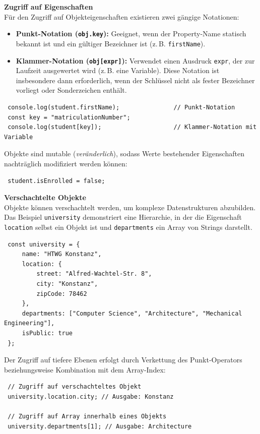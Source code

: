 \textbf{Zugriff auf Eigenschaften}\\
Für den Zugriff auf Objekteigenschaften existieren zwei gängige Notationen:
\begin{itemize}
	\item \textbf{Punkt-Notation (\texttt{obj.key}):} Geeignet, wenn der Property-Name statisch bekannt ist und ein gültiger Bezeichner ist (z.\,B. \texttt{firstName}).
	\item \textbf{Klammer-Notation (\texttt{obj[expr]}):} Verwendet einen Ausdruck \texttt{expr}, der zur Laufzeit ausgewertet wird (z.\,B. eine Variable). Diese Notation ist insbesondere dann erforderlich, wenn der Schlüssel nicht als fester Bezeichner vorliegt oder Sonderzeichen enthält.
\end{itemize}
\begin{verbatim}
 console.log(student.firstName);               // Punkt-Notation
 const key = "matriculationNumber";
 console.log(student[key]);                    // Klammer-Notation mit Variable
\end{verbatim}

Objekte sind mutable (\textit{veränderlich}), sodass Werte bestehender Eigenschaften nachträglich modifiziert werden können:
\begin{verbatim}
 student.isEnrolled = false;
\end{verbatim}

\textbf{Verschachtelte Objekte}\\
Objekte können verschachtelt werden, um komplexe Datenstrukturen abzubilden. Das Beispiel \texttt{university} demonstriert eine Hierarchie, in der die Eigenschaft \texttt{location} selbst ein Objekt ist und \texttt{departments} ein Array von Strings darstellt.
\begin{verbatim}
 const university = {
     name: "HTWG Konstanz",
     location: {
         street: "Alfred-Wachtel-Str. 8",
         city: "Konstanz",
         zipCode: 78462
     },
     departments: ["Computer Science", "Architecture", "Mechanical Engineering"],
     isPublic: true
 };
\end{verbatim}

Der Zugriff auf tiefere Ebenen erfolgt durch Verkettung des Punkt-Operators beziehungsweise Kombination mit dem Array-Index:
\begin{verbatim}
 // Zugriff auf verschachteltes Objekt
 university.location.city; // Ausgabe: Konstanz
	
 // Zugriff auf Array innerhalb eines Objekts
 university.departments[1]; // Ausgabe: Architecture
\end{verbatim}


